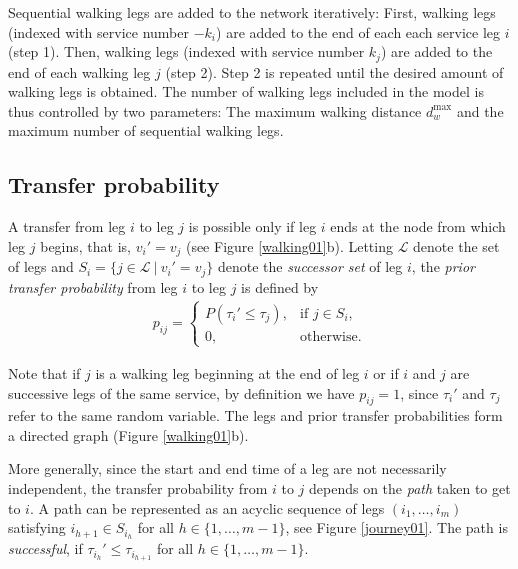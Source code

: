 \documentclass[dissertation,draft*]{aaltoseries}
\begin{document}
Sequential walking legs are added to the network iteratively:
First, walking legs (indexed with service number $-k_i$) are added to the end of each each service leg $i$ (step 1).
Then, walking legs (indexed with service number $k_j$) are added to the end of each walking leg $j$ (step 2).
Step 2 is repeated until the desired amount of walking legs is obtained.
The number of walking legs included in the model is thus controlled by two parameters:
The maximum walking distance $d_w^{\max }$ and the maximum number of sequential walking legs.


\subsection{Transfer probability}
A transfer from leg $i$ to leg $j$ is possible only if leg $i$ ends at the node from which leg $j$ begins, that is, $v_{i}' = v_{j}$ (see Figure \ref{walking01}b).
Letting $\mathcal{L}$ denote the set of legs and $S_i = \{j \in \mathcal{L} \ | \ v_{i}' = v_{j} \}$ denote the 
\emph{successor set} of leg $i$,
the \emph{prior transfer probability} from leg $i$ to leg $j$ is defined by
\begin{align}
\label{transferprob}
p_{ij}=
\left\{
\begin{array}{ll}
P(\tau_{i}' \leq \tau_{j}), & \mbox{if $j \in S_{i}$}, \\
0, & \mbox{otherwise.}
\end{array}
\right.
\end{align}

Note that if $j$ is a walking leg beginning at the end of leg $i$
or if $i$ and $j$ are successive legs of the same service,
by definition we have $p_{ij}= 1$, since $\tau_{i}'$ and $\tau_{j}$ refer to the same random variable. 
The legs and prior transfer probabilities
form a directed graph (Figure \ref{walking01}b).

More generally, since the start and end time of a leg are not necessarily independent, 
the transfer probability from $i$ to $j$ depends on the \emph{path} taken to get to $i$.
A path can be represented as an acyclic sequence of legs $(i_1,\ldots,i_m)$ satisfying
$i_{h+1} \in S_{i_h}$ for all $h \in \{1,\ldots,m-1\}$, see Figure \ref{journey01}. 
The path is \emph{successful}, if $\tau_{i_h}' \leq \tau_{i_{h+1}}$ for all $h \in \{1,\ldots,m-1\}$.
\end{document}
